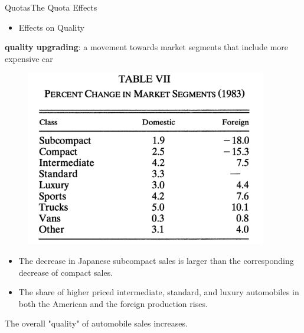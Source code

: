 \documentclass{beamer}
\begin{document}
\begin{frame}{Quotas}{The Quota Effects}

   \begin{itemize}
	   \item Effects on Quality
	  
	 \end{itemize}

	 \textbf{quality upgrading}:
	 a movement towards market segments that include more expensive car

   \begin{figure}[h]
	   \centering          			
	   \includegraphics[scale=0.7]{table7.png}
	   \end{figure} 

	   \begin{itemize}
	   \item The decrease in Japanese subcompact sales is larger than the
	   corresponding decrease of compact sales.
	   \item The share of higher priced intermediate, standard, and luxury automobiles in both the American and the foreign production rises.
   \end{itemize}

	   The overall "quality" of automobile sales increases.
\end{frame}	
\end{document}
